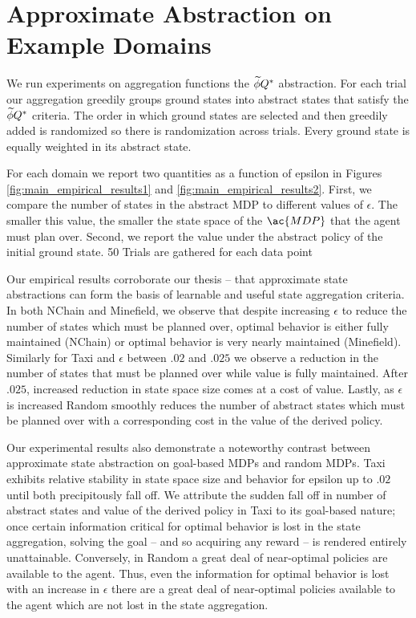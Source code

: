 \section{Approximate Abstraction on Example Domains}
We run experiments on aggregation functions the $\widetilde \phi{Q^*}$ abstraction. For each trial our aggregation greedily groups ground states into abstract states that satisfy the $\widetilde \phi{Q^*}$ criteria. The order in which ground states are selected and then greedily added is randomized so there is randomization across trials. Every ground state is equally weighted in its abstract state.

For each domain we report two quantities as a function of epsilon in Figures \ref{fig:main_empirical_results1} and \ref{fig:main_empirical_results2}. First, we compare the number of states in the abstract \ac{MDP} to different values of $\epsilon$. The smaller this value, the smaller the state space of the $\ac{MDP}$ that the agent must plan over. Second, we report the value under the abstract policy of the initial ground state. 50 Trials are gathered for each data point 

Our empirical results corroborate our thesis -- that approximate state abstractions can form the basis of learnable and useful state aggregation criteria. In both NChain and Minefield, we observe that despite increasing $\epsilon$ to reduce the number of states which must be planned over, optimal behavior is either fully maintained (NChain) or optimal behavior is very nearly maintained (Minefield). Similarly for Taxi and $\epsilon$ between $.02$ and $.025$ we observe a reduction in the number of states that must be planned over while value is fully maintained. After $.025$, increased reduction in state space size comes at a cost of value. Lastly, as $\epsilon$ is increased Random smoothly reduces the number of abstract states which must be planned over with a corresponding cost in the value of the derived policy.

Our experimental results also demonstrate a noteworthy contrast between approximate state abstraction on goal-based \acp{MDP} and random \acp{MDP}. Taxi exhibits relative stability in state space size and behavior for epsilon up to $.02$ until both precipitously fall off. We attribute the sudden fall off in number of abstract states and value of the derived policy in Taxi to its goal-based nature; once certain information critical for optimal behavior is lost in the state aggregation, solving the goal -- and so acquiring any reward -- is rendered entirely unattainable. Conversely, in Random a great deal of near-optimal policies are available to the agent. Thus, even the information for optimal behavior is lost with an increase in $\epsilon$ there are a great deal of near-optimal policies available to the agent which are not lost in the state aggregation.

